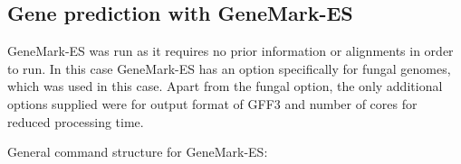 




\subsection{Gene prediction with GeneMark-ES}

GeneMark-ES was run as it requires no prior information or alignments
in order to run. In this case GeneMark-ES has an option specifically
for fungal genomes, which was used in this case. Apart from the fungal
option, the only additional options supplied were for output format of
GFF3 and number of cores for reduced processing time.

General command structure for GeneMark-ES:

